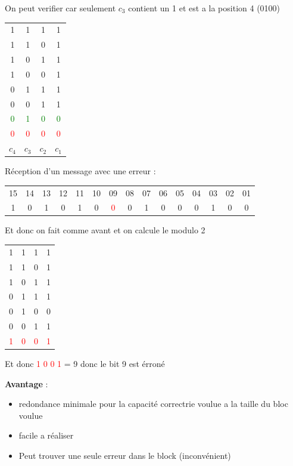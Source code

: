 \documentclass[12pt]{article}
\begin{document}
				On peut verifier  car seulement $c_3$ contient un 1 et est a la position 4 (0100)
				
				\begin{tabular}{cccc}
				1 & 1 & 1 & 1\\
				1 & 1 & 0 & 1\\
				1 & 0 & 1 & 1\\
				1 & 0 & 0 & 1\\
				0 & 1 & 1 & 1\\
				0 & 0 & 1 & 1\\ 
				\textcolor{green}{0} & \textcolor{green}{1} & \textcolor{green}{0} & \textcolor{green}{0}\\\hline
				\textcolor{red}{0} & \textcolor{red}{0} & \textcolor{red}{0} & \textcolor{red}{0}\\
				$c_4$ & $c_3$ & $c_2$ & $c_1$
				
				\end{tabular}
				
				Réception d'un message avec une erreur :
				
				\begin{tabular}{ccccccccccccccc}
					15 & 14 & 13 & 12 & 11 & 10 & 09 & 08 & 07 & 06 & 05 & 04 & 03 & 02 & 01\\
					1 & 0 & 1 & 0 & 1 & 0 & \textcolor{red}{0} & 0 & 1 & 0 & 0 & 0 & 1 & 0 & 0 
				\end{tabular}
				
				Et donc on fait comme avant et on calcule le modulo 2
				
				\begin{tabular}{cccc}
				1 & 1 & 1 & 1\\
				1 & 1 & 0 & 1\\
				1 & 0 & 1 & 1\\
				0 & 1 & 1 & 1\\
				0 & 1 & 0 & 0\\
				0 & 0 & 1 & 1\\ \hline
				\textcolor{red}{1} & \textcolor{red}{0} & \textcolor{red}{0} & \textcolor{red}{1}
				
				\end{tabular}
				
				Et donc \textcolor{red}{1} \textcolor{red}{0} \textcolor{red}{0} \textcolor{red}{1} = 9 donc le bit 9 est érroné
				
			\textbf{Avantage} :
			\begin{itemize}
				\item redondance minimale pour la capacité correctrie voulue a la taille du bloc voulue
				\item facile a réaliser
				\item Peut trouver une seule erreur dans le block (inconvénient)
			\end{itemize}
			
\end{document}
